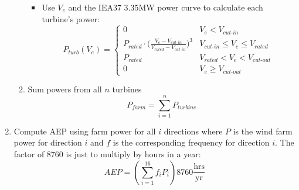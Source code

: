 \documentclass[10pt]{article}
\begin{document}
\begin{enumerate}
\begin{enumerate}
\begin{itemize}
\begin{equation*}
                            \end{equation*}
                        \item Use $V_{e}$ and the IEA37 3.35MW power curve to calculate each turbine's power:
                            \begin{equation}
                                \label{Eq:Power}
                                P_{turb}(V_{e}) = 
                                \begin{cases} 
                                    0 & V_{e} < V_{\textit{cut-in}} \\
                                    P_{\textit{rated}}\cdot\bigg(\frac{V_{e}-V_{\textit{cut-in}}}{V_{\textit{rated}}-V_{\textit{cut-in}}}\bigg)^3 & V_{\textit{cut-in}}\leq V_{e} \leq V_{\textit{rated}} \\
                                    P_{\textit{rated}} & V_{\textit{rated}} < V_{e} < V_{\textit{cut-out}} \\
                                    0 &  V_{e} \ge V_{\textit{cut-out}} 
                                \end{cases}
                            \end{equation}
                        \end{itemize}
                    \item Sum powers from all $n$ turbines
                        \begin{equation}
                            P_{farm} = \sum_{i=1}^n P_{turbine}
                        \end{equation}
            \end{enumerate}
        \item Compute AEP using farm power for all $i$ directions where $P$ is the wind farm power for direction $i$ and $f$ is the corresponding frequency for direction $i$.  The factor of 8760 is just to multiply by hours in a year:
        \begin{equation}
        AEP = \left(\sum_{i=1}^{16} f_i P_i\right) 8760 \frac{\textrm{hrs}}{\textrm{yr}}
        \end{equation}
        
    \end{enumerate}





\end{document}
